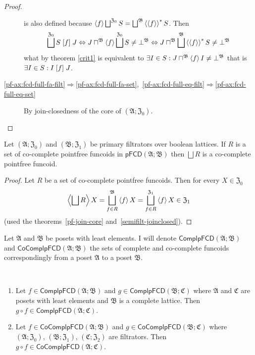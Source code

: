 \begin{proof}
\begin{description}
is also defined because $\supfun f\bigsqcup^{\mathfrak{Z}_{0}}S=\bigsqcup^{\mathfrak{B}}\rsupfun{\supfun f}S$.
Then
\[
\bigsqcup^{\mathfrak{Z}_{0}}S\suprel fJ\Leftrightarrow J\sqcap^{\mathfrak{B}}\supfun f\bigsqcup^{\mathfrak{Z}_{0}}S\neq\bot^{\mathfrak{B}}\Leftrightarrow J\sqcap^{\mathfrak{B}}\bigsqcup^{\mathfrak{B}}\rsupfun{\supfun f}S\neq\bot^{\mathfrak{B}}
\]
what by theorem \ref{crit1} is equivalent to $\exists I\in S:J\sqcap^{\mathfrak{B}}\left\langle f\right\rangle I\neq\bot^{\mathfrak{B}}$
that is $\exists I\in S:I\mathrel{\left[f\right]}J$.
\item [{\ref{pf-ax:fcd-full-fa-filt}$\Rightarrow$\ref{pf-ax:fcd-full-fa-set},~\ref{pf-ax:fcd-full-eq-filt}$\Rightarrow$\ref{pf-ax:fcd-full-eq-set}}] By
join-closedness of the core of $(\mathfrak{A};\mathfrak{Z}_{0})$.
\end{description}
\end{proof}
\begin{thm}
\label{pf-join-cocompl}Let $(\mathfrak{A};\mathfrak{Z}_{0})$ and
$(\mathfrak{B};\mathfrak{Z}_{1})$ be primary filtrators over boolean
lattices. If $R$ is a set of co-complete pointfree funcoids in $\mathsf{pFCD}(\mathfrak{A};\mathfrak{B})$
then $\bigsqcup R$ is a co-complete pointfree funcoid.\end{thm}
\begin{proof}
Let $R$ be a set of co-complete pointfree funcoids. Then for every
$X\in\mathfrak{Z}_{0}$
\[
\supfun{\bigsqcup R}X=\bigsqcup_{f\in R}^{\mathfrak{B}}\supfun fX=\bigsqcup_{f\in R}^{\mathfrak{Z}_{1}}\supfun fX\in\mathfrak{Z}_{1}
\]
(used the theorems~\ref{pf-join-core} and~\ref{semifilt-joinclosed}).
\end{proof}
Let $\mathfrak{A}$ and $\mathfrak{B}$ be posets with least elements.
I will denote $\mathsf{ComplpFCD}(\mathfrak{A};\mathfrak{B})$ and
$\mathsf{CoComplpFCD}(\mathfrak{A};\mathfrak{B})$ the sets of complete
and co-complete funcoids correspondingly from a poset $\mathfrak{A}$
to a poset $\mathfrak{B}$.
\begin{prop}
~
\begin{enumerate}
\item \label{pf-compl-comp}Let $f\in\mathsf{ComplpFCD}(\mathfrak{A};\mathfrak{B})$
and $g\in\mathsf{ComplpFCD}(\mathfrak{B};\mathfrak{C})$ where $\mathfrak{A}$
and $\mathfrak{C}$ are posets with least elements and $\mathfrak{B}$
is a complete lattice. Then $g\circ f\in\mathsf{ComplpFCD}(\mathfrak{A};\mathfrak{C})$.
\item \label{pf-cocompl-comp}Let $f\in\mathsf{CoComplpFCD}(\mathfrak{A};\mathfrak{B})$
and $g\in\mathsf{CoComplpFCD}(\mathfrak{B};\mathfrak{C})$ where 
$(\mathfrak{A};\mathfrak{Z}_{0})$, $(\mathfrak{B};\mathfrak{Z}_{1})$,
$(\mathfrak{C};\mathfrak{Z}_{2})$ are filtrators. Then $g\circ f\in\mathsf{CoComplpFCD}(\mathfrak{A};\mathfrak{C})$.
\end{enumerate}
\end{prop}
